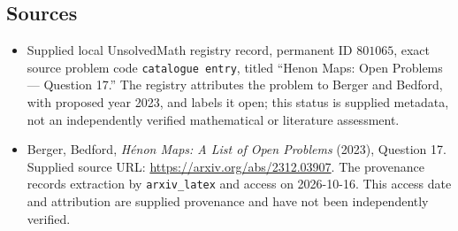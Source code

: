 \documentclass[11pt]{article}
\begin{document}
\subsection{Sources}
\begin{itemize}
\item Supplied local UnsolvedMath registry record, permanent ID \(801065\), exact source problem code \texttt{catalogue entry}, titled ``Henon Maps: Open Problems --- Question 17.'' The registry attributes the problem to Berger and Bedford, with proposed year 2023, and labels it open; this status is supplied metadata, not an independently verified mathematical or literature assessment.
\item Berger, Bedford, \emph{H\'enon Maps: A List of Open Problems} (2023), Question 17. Supplied source URL: \url{https://arxiv.org/abs/2312.03907}. The provenance records extraction by \texttt{arxiv\_latex} and access on 2026-10-16. This access date and attribution are supplied provenance and have not been independently verified.
\end{itemize}
\end{document}

